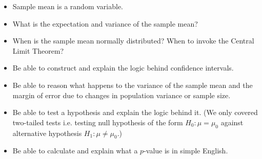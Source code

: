 \documentclass{./../../Latex/handout}
\begin{document}
\begin{enumerate}
\begin{itemize}
\item Sample mean is a random variable. 
\item What is the expectation and variance of the sample mean? 
\item When is the sample mean normally distributed? When to invoke the Central Limit Theorem? 
\item Be able to construct and explain the logic behind confidence intervals.
\item Be able to reason what happens to the variance of the sample mean and the margin of error due to changes in population variance or sample size. 
\item Be able to test a hypothesis and explain the logic behind it. (We only covered two-tailed tests i.e. testing null hypothesis of the form $H_0: \mu = \mu_0$ against alternative hypothesis $H_1: \mu \neq \mu_0$.)
\item Be able to calculate and explain what a $p$-value is in simple English. 
\end{itemize}
\end{enumerate}
\end{document}
